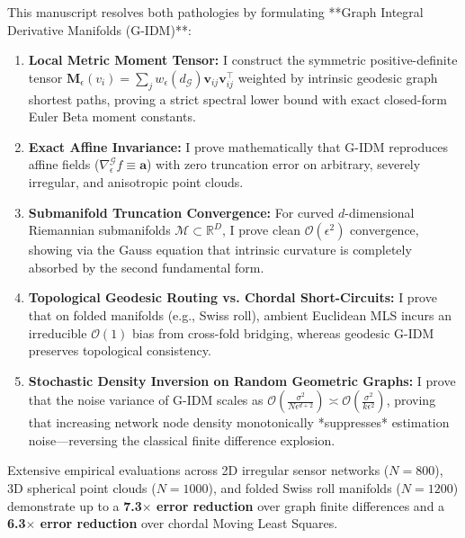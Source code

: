 \documentclass[11pt,a4paper]{article}
\begin{document}
This manuscript resolves both pathologies by formulating **Graph Integral Derivative Manifolds (G-IDM)**:
\begin{enumerate}
    \item \textbf{Local Metric Moment Tensor:} I construct the symmetric positive-definite tensor $\mathbf{M}_\epsilon(v_i) = \sum_{j} w_\epsilon(d_{\mathcal{G}}) \mathbf{v}_{ij} \mathbf{v}_{ij}^\top$ weighted by intrinsic geodesic graph shortest paths, proving a strict spectral lower bound with exact closed-form Euler Beta moment constants.
    \item \textbf{Exact Affine Invariance:} I prove mathematically that G-IDM reproduces affine fields ($\nabla_\epsilon^{\mathcal{G}} f \equiv \mathbf{a}$) with zero truncation error on arbitrary, severely irregular, and anisotropic point clouds.
    \item \textbf{Submanifold Truncation Convergence:} For curved $d$-dimensional Riemannian submanifolds $\mathcal{M} \subset \mathbb{R}^D$, I prove clean $\mathcal{O}(\epsilon^2)$ convergence, showing via the Gauss equation that intrinsic curvature is completely absorbed by the second fundamental form.
    \item \textbf{Topological Geodesic Routing vs. Chordal Short-Circuits:} I prove that on folded manifolds (e.g., Swiss roll), ambient Euclidean MLS incurs an irreducible $\mathcal{O}(1)$ bias from cross-fold bridging, whereas geodesic G-IDM preserves topological consistency.
    \item \textbf{Stochastic Density Inversion on Random Geometric Graphs:} I prove that the noise variance of G-IDM scales as $\mathcal{O}\left(\frac{\sigma^2}{N \epsilon^{d+2}}\right) \asymp \mathcal{O}\left(\frac{\sigma^2}{k \epsilon^2}\right)$, proving that increasing network node density monotonically *suppresses* estimation noise—reversing the classical finite difference explosion.
\end{enumerate}

Extensive empirical evaluations across 2D irregular sensor networks ($N = 800$), 3D spherical point clouds ($N = 1000$), and folded Swiss roll manifolds ($N = 1200$) demonstrate up to a \textbf{7.3$\times$ error reduction} over graph finite differences and a \textbf{6.3$\times$ error reduction} over chordal Moving Least Squares.
\end{document}
